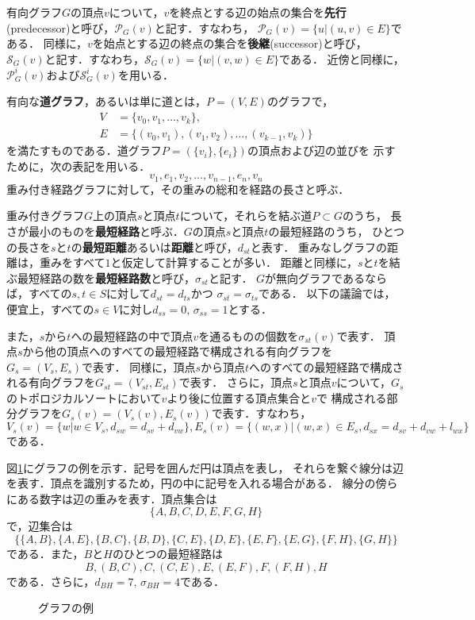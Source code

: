 有向グラフ$G$の頂点$v$について，$v$を終点とする辺の始点の集合を\textbf{先行}
(predecessor)と呼び，$\mathcal{P}_G(v)$と記す．すなわち，
$\mathcal{P}_G(v)=\{u|(u,v)\in E\}$である．
同様に，$v$を始点とする辺の終点の集合を\textbf{後継}(successor)と呼び，
$\mathcal{S}_G(v)$と記す．すなわち，$\mathcal{S}_G(v)=\{w|(v,w)\in E\}$である．
近傍と同様に，$\mathcal{P}_G^i(v)$および$\mathcal{S}_G^i(v)$を用いる．

有向な\textbf{道グラフ}，あるいは単に道とは，$P=(V,E)$のグラフで，
\begin{equation*}
  \begin{aligned}
  V&=\{v_0,v_1,\ldots,v_k\}, \\
  E&=\{(v_0,v_1),(v_1,v_2),\ldots,(v_{k-1},v_k)\}
  \end{aligned}
\end{equation*}
を満たすものである．道グラフ$P=(\{v_i\},\{e_i\})$の頂点および辺の並びを
示すために，次の表記を用いる．
\[ v_1,e_1,v_2,\ldots,v_{n-1},e_n,v_n \]
重み付き経路グラフに対して，その重みの総和を経路の長さと呼ぶ．

重み付きグラフ$G$上の頂点$s$と頂点$t$について，それらを結ぶ道$P\subset G$のうち，
長さが最小のものを\textbf{最短経路}と呼ぶ．$G$の頂点$s$と頂点$t$の最短経路のうち，
ひとつの長さを$s$と$t$の\textbf{最短距離}あるいは\textbf{距離}と呼び，$d_{st}$と表す．
重みなしグラフの距離は，重みをすべて$1$と仮定して計算することが多い．
距離と同様に，$s$と$t$を結ぶ最短経路の数を\textbf{最短経路数}と呼び，$\sigma_{st}$と記す．
$G$が無向グラフであるならば，すべての$s,t\in S$に対して$d_{st}=d_{ts}$かつ
$\sigma_{st}=\sigma_{ts}$である．
以下の議論では，便宜上，すべての$s\in V$に対し$d_{ss}=0$, $\sigma_{ss}=1$とする．

また，$s$から$t$への最短経路の中で頂点$v$を通るものの個数を$\sigma_{st}(v)$で表す．
頂点$s$から他の頂点へのすべての最短経路で構成される有向グラフを$G_s=(V_s,E_s)$で表す．
同様に，頂点$s$から頂点$t$へのすべての最短経路で構成される有向グラフを$G_{st}=(V_{st},E_{st})$で表す．
さらに，頂点$s$と頂点$v$について，$G_s$のトポロジカルソートにおいて$v$より後に位置する頂点集合と$v$で
構成される部分グラフを$G_s(v)=(V_s(v),E_s(v))$で表す．すなわち，
$V_s(v)=\{w|w\in V_s,d_{sw}=d_{sv}+d_{vw}\}, E_s(v)=\{(w,x)|(w,x)\in E_s,d_{sx}=d_{sv}+d_{vw}+l_{wx}\}$
である．

\begin{example}
  図\ref{fig:graph-diamond}にグラフの例を示す．記号を囲んだ円は頂点を表し，
  それらを繋ぐ線分は辺を表す．頂点を識別するため，円の中に記号を入れる場合がある．
  線分の傍らにある数字は辺の重みを表す．頂点集合は
  \[ \{A,B,C,D,E,F,G,H\} \]
  で，辺集合は
  \[ \{\{A,B\},\{A,E\},\{B,C\},\{B,D\},\{C,E\},\{D,E\},\{E,F\},\{E,G\},\{F,H\},\{G,H\}\} \]
  である．また，$B$と$H$のひとつの最短経路は
  \[ B,(B,C),C,(C,E),E,(E,F),F,(F,H),H \]
  である．さらに，$d_{BH}=7,\,\sigma_{BH}=4$である．
  \begin{figure}
    \centering
    \def\svgwidth{.45\textwidth}
    
    \caption{グラフの例}
    \label{fig:graph-diamond}
  \end{figure}
\end{example}

